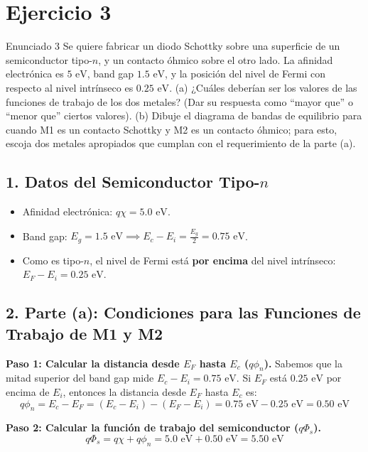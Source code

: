 \documentclass[11pt,a4paper]{article}
\begin{document}
\section*{Ejercicio 3}
\begin{ejerciciobox}{Enunciado 3}
Se quiere fabricar un diodo Schottky sobre una superficie de un semiconductor tipo-$n$, y un contacto óhmico sobre el otro lado. La afinidad electrónica es $5\text{ eV}$, band gap $1.5\text{ eV}$, y la posición del nivel de Fermi con respecto al nivel intrínseco es $0.25\text{ eV}$. (a) ¿Cuáles deberían ser los valores de las funciones de trabajo de los dos metales? (Dar su respuesta como ``mayor que'' o ``menor que'' ciertos valores). (b) Dibuje el diagrama de bandas de equilibrio para cuando M1 es un contacto Schottky y M2 es un contacto óhmico; para esto, escoja dos metales apropiados que cumplan con el requerimiento de la parte (a).
\end{ejerciciobox}

\subsection*{1. Datos del Semiconductor Tipo-$n$}
\begin{itemize}
    \item Afinidad electrónica: $q\chi = 5.0\text{ eV}$.
    \item Band gap: $E_g = 1.5\text{ eV} \implies E_c - E_i = \frac{E_g}{2} = 0.75\text{ eV}$.
    \item Como es tipo-$n$, el nivel de Fermi está \textbf{por encima} del nivel intrínseco: $E_F - E_i = 0.25\text{ eV}$.
\end{itemize}

\subsection*{2. Parte (a): Condiciones para las Funciones de Trabajo de M1 y M2}
\textbf{Paso 1: Calcular la distancia desde $E_F$ hasta $E_c$ ($q\phi_n$).}
Sabemos que la mitad superior del band gap mide $E_c - E_i = 0.75\text{ eV}$. Si $E_F$ está $0.25\text{ eV}$ por encima de $E_i$, entonces la distancia desde $E_F$ hasta $E_c$ es:
\[
q\phi_n = E_c - E_F = (E_c - E_i) - (E_F - E_i) = 0.75\text{ eV} - 0.25\text{ eV} = 0.50\text{ eV}
\]

\textbf{Paso 2: Calcular la función de trabajo del semiconductor ($q\Phi_s$).}
\[
q\Phi_s = q\chi + q\phi_n = 5.0\text{ eV} + 0.50\text{ eV} = 5.50\text{ eV}
\]
\end{document}
